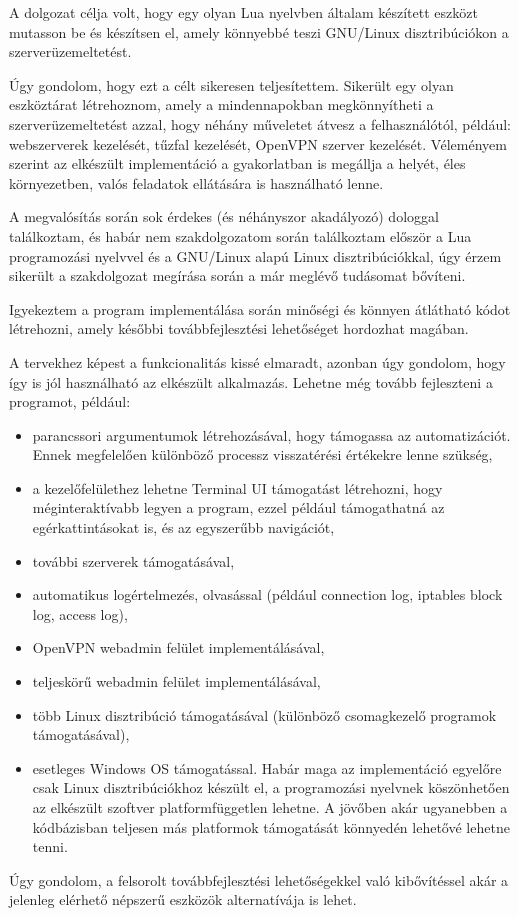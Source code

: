 
A dolgozat célja volt, hogy egy olyan Lua nyelvben általam készített eszközt mutasson be és készítsen el, amely könnyebbé teszi GNU/Linux disztribúciókon a szerverüzemeltetést.

Úgy gondolom, hogy ezt a célt sikeresen teljesítettem. Sikerült egy olyan eszköztárat létrehoznom, amely a mindennapokban megkönnyítheti a szerverüzemeltetést azzal, hogy néhány műveletet átvesz a felhasználótól, például: webszerverek kezelését, tűzfal kezelését, OpenVPN szerver kezelését. Véleményem szerint az elkészült implementáció a gyakorlatban is megállja a helyét, éles környezetben, valós feladatok ellátására is használható lenne.

A megvalósítás során sok érdekes (és néhányszor akadályozó) dologgal találkoztam, és habár nem szakdolgozatom során találkoztam először a Lua programozási nyelvvel és a GNU/Linux alapú Linux disztribúciókkal, úgy érzem sikerült a szakdolgozat megírása során a már meglévő tudásomat bővíteni.

Igyekeztem a program implementálása során minőségi és könnyen átlátható kódot létrehozni, amely későbbi továbbfejlesztési lehetőséget hordozhat magában.

A tervekhez képest a funkcionalitás kissé elmaradt, azonban úgy gondolom, hogy így is jól használható az elkészült alkalmazás. Lehetne még tovább fejleszteni a programot, például:
\begin{itemize}
	\item parancssori argumentumok létrehozásával, hogy támogassa az automatizációt. Ennek megfelelően különböző processz visszatérési értékekre lenne szükség,
	\item a kezelőfelülethez lehetne Terminal UI támogatást létrehozni, hogy méginteraktívabb legyen a program, ezzel például támogathatná az egérkattintásokat is, és az egyszerűbb navigációt,
	\item további szerverek támogatásával,
	\item automatikus logértelmezés, olvasással (például connection log, iptables block log, access log),
	\item OpenVPN webadmin felület implementálásával,
	\item teljeskörű webadmin felület implementálásával,
	\item több Linux disztribúció támogatásával (különböző csomagkezelő programok támogatásával),
	\item esetleges Windows OS támogatással. Habár maga az implementáció egyelőre csak Linux disztribúciókhoz készült el, a programozási nyelvnek köszönhetően az elkészült szoftver platformfüggetlen lehetne. A jövőben akár ugyanebben a kódbázisban teljesen más platformok támogatását könnyedén lehetővé lehetne tenni.
\end{itemize}

Úgy gondolom, a felsorolt továbbfejlesztési lehetőségekkel való kibővítéssel akár a jelenleg elérhető népszerű eszközök alternatívája is lehet.